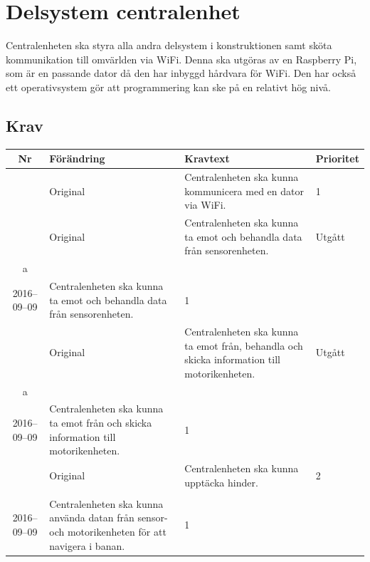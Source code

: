 \documentclass[a4paper,titlepage,12pt]{article}
\newcounter{reqNr}
\newcommand{\nextReqNr}{\stepcounter{reqNr}\arabic{reqNr}}
\newcounter{reqNrII}
\newcommand{\nextReqNrII}{\stepcounter{reqNrII}\arabic{reqNrII}}
\newcommand{\newContent}[1] {\pbox{5cm}{Nytt innehåll i \arabic{reqNr}\\#1}}
\newcommand{\newRequirement}[1] {\pbox{5cm}{Nytt krav \\#1}}
\begin{document}
	\section{Delsystem centralenhet}
	Centralenheten ska styra alla andra delsystem i konstruktionen samt sköta
	kommunikation till omvärlden via WiFi. Denna ska utgöras av en Raspberry
	Pi, som är en passande dator då den har inbyggd hårdvara för WiFi. Den har 
	också ett operativsystem gör att programmering kan ske på en relativt hög nivå.

	\newpage

	\subsection{Krav}
	\begin{table}[h]
		\begin{tabularx}{\textwidth}{c l X l}
			\textbf{Nr} & \textbf{Förändring} & \textbf{Kravtext} & \textbf{Prioritet} 
				\\ \midrule

			\nextReqNr{} & Original & Centralenheten ska kunna kommunicera 
				med en dator via WiFi. & 1
				\\ \midrule

			\nextReqNr{} & Original & Centralenheten ska kunna ta emot och 
				behandla data från sensorenheten.& Utgått
				\\ \midrule
			\arabic{reqNr}a & \newContent{2016--09--09} & Centralenheten ska kunna ta emot och 
				behandla data från sensorenheten.& 1
				\\ \midrule

			\nextReqNr{} & Original & Centralenheten ska kunna ta emot från, 
				behandla och skicka information till motorikenheten. & Utgått
				\\ \midrule
			\arabic{reqNr}a & \newContent{2016--09--09} & Centralenheten ska kunna ta emot från
				 och skicka information till motorikenheten. & 1
				\\ \midrule

			\nextReqNr{} & Original & Centralenheten ska kunna upptäcka hinder. & 2
			\\ \midrule

			\nextReqNrII{} & \newRequirement{2016--09--09} & Centralenheten ska kunna använda
			datan från sensor- och motorikenheten för att navigera i banan.  & 1
		\end{tabularx}
	\end{table}
\end{document}
